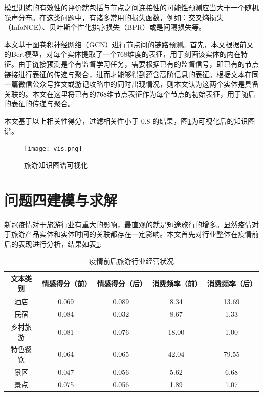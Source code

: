 \documentclass[bwprint]{gmcmthesis}
\begin{document}
模型训练的有效性的评价就包括与节点之间连接性的可能性预测应当大于一个随机噪声分布。在这类问题中，有诸多常用的损失函数，例如：交叉熵损失（InfoNCE）、贝叶斯个性化排序损失（BPR）或是间隔损失等。

本文基于图卷积神经网络（GCN）进行节点间的链路预测。首先，本文根据前文的Bert模型，对每个实体提取了一个768维度的表征，用于刻画该实体的内在特征。由于链接预测是个有监督学习任务，需要根据已有的监督信号，即已有的节点链接进行表征的传递与聚合，进而才能够得到蕴含高阶信息的表征。根据文本在同一篇微信公众号推文或游记攻略中的同时出现情况，则本文认为这两个实体是具备关联的。本文在这里将已有的768维节点表征作为每个节点的初始表征，用于随后的表征的传递与聚合。

本文基于以上相关性得分，过滤相关性小于 0.8 的结果，图\ref{vis}为可视化后的知识图谱。
\newpage

\begin{figure}[!h]
  \centering
  \texttt{[image: vis.png]}
  \caption{旅游知识图谱可视化}
  \label{vis}
  \end{figure}


\section{问题四建模与求解}

新冠疫情对于旅游行业有重大的影响，最直观的就是短途旅行的增多。显然疫情对于旅游产品实体和实体时间的关联都存在一定影响。本文首先对行业整体在疫情前后的表现进行分析，结果如表\ref{hangye_beforeafter}:

\begin{center}
    \begin{longtable}{c|c|c|c|c}
      \caption{疫情前后旅游行业经营状况}
      \label{hangye_beforeafter}\\
        \hline
        \textbf{文本类别} & \textbf{情感得分（前）} & \textbf{情感得分（后）} & \textbf{消费频率（前）} & \textbf{消费频率（后）} \\
        \hline
          酒店 & 0.069 & 0.089 &  8.34 & 13.69 \\
		  民宿 & 0.084 & 0.032 &  8.67 & 1.33 \\
		  乡村旅游 & 0.081 & 0.076 & 18.00 & 1.00 \\
		  特色餐饮 & 0.064 & 0.065 & 42.04 & 79.55 \\
		  景区 & 0.047 & 0.056 & 5.62 & 6.68 \\
		  景点 & 0.075 & 0.056 & 1.89 & 1.07 \\
        \hline
    \end{longtable}
    \end{center}
\end{document}
